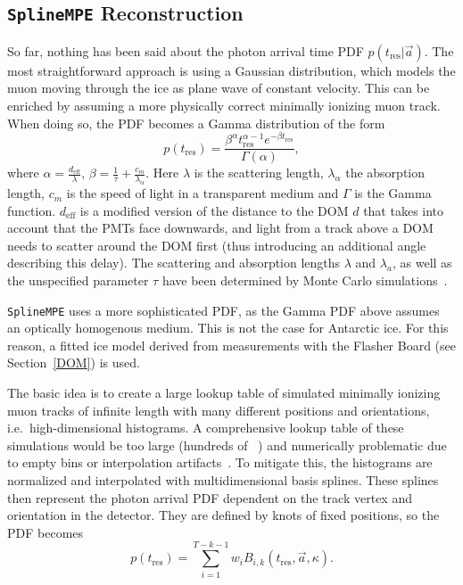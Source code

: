 \subsection{\texttt{SplineMPE} Reconstruction}\label{spline_mpe}
So far, nothing has been said about the photon arrival time PDF $p(t_\text{res}|\vec{a})$. The most straightforward approach is using a Gaussian distribution, which models the muon moving through the ice as plane wave of constant velocity. This can be enriched by assuming a more physically correct minimally ionizing muon track. When doing so, the PDF becomes a Gamma distribution of the form
\begin{equation}
    p(t_\text{res}) = \frac{\beta^\alpha t_\text{res}^{\alpha-1} e^{-\beta t_\text{res}}}{\Gamma(\alpha)},
\end{equation}
where $\alpha=\frac{d_\text{eff}}{\lambda}$, $\beta=\frac{1}{\tau} + \frac{c_m}{\lambda_\alpha}$. Here $\lambda$ is the scattering length, $\lambda_\alpha$ the absorption length, $c_m$ is the speed of light in a transparent medium and $\Gamma$ is the Gamma function. $d_\text{eff}$ is a modified version of the distance to the DOM $d$ that takes into account that the PMTs face downwards, and light from a track above a DOM needs to scatter around the DOM first (thus introducing an additional angle describing this delay). The scattering and absorption lengths $\lambda$ and $\lambda_a$, as well as the unspecified parameter $\tau$ have been determined by Monte Carlo simulations~.

\texttt{SplineMPE} uses a more sophisticated PDF, as the Gamma PDF above assumes an optically homogenous medium. This is not the case for Antarctic ice. For this reason, a fitted ice model derived from measurements with the Flasher Board (see Section~\ref{DOM}) is used.

The basic idea is to create a large lookup table of simulated minimally ionizing muon tracks of infinite length with many different positions and orientations, i.e.\ high-dimensional histograms. A comprehensive lookup table of these simulations would be too large (hundreds of \unit{\giga\byte}) and numerically problematic due to empty bins or interpolation artifacts~. To mitigate this, the histograms are normalized and interpolated with multidimensional basis splines. These splines then represent the photon arrival PDF dependent on the track vertex and orientation in the detector. They are defined by knots of fixed positions, so the PDF becomes
\begin{equation}
    p(t_\text{res}) = \sum_{i=1}^{T-k-1} w_i B_{i,k}(t_\text{res},\vec{a}, \kappa).
\end{equation}

